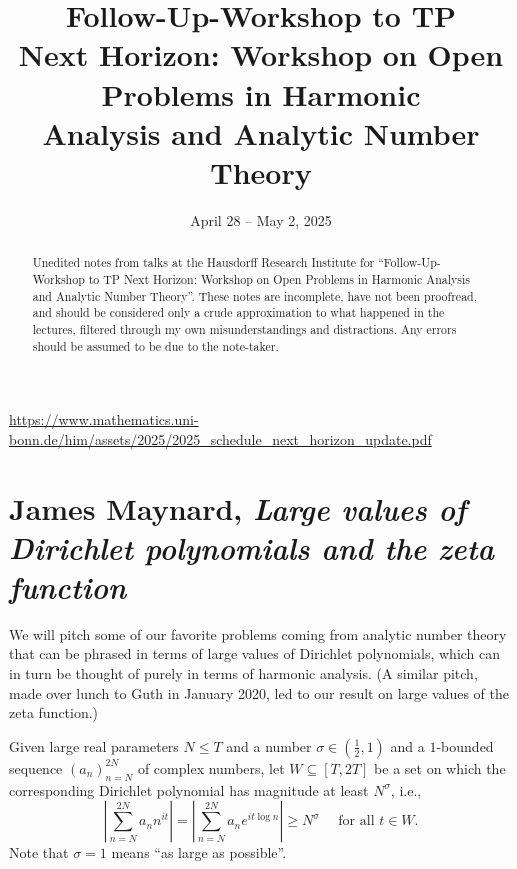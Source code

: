\documentclass[reqno]{amsart} 
\numberwithin{theorem}{section}
\numberwithin{equation}{section}
\begin{document}
\title{Follow-Up-Workshop to TP \\ Next Horizon: Workshop on Open Problems in Harmonic \\ Analysis and Analytic Number Theory}

\begin{abstract}
  Unedited notes from talks at the Hausdorff Research Institute for ``Follow-Up-Workshop to TP Next Horizon: Workshop on Open Problems in Harmonic Analysis and Analytic Number Theory''.  These notes are incomplete, have not been proofread, and should be considered only a crude approximation to what happened in the lectures, filtered through my own misunderstandings and distractions.  Any errors should be assumed to be due to the note-taker.
\end{abstract}

\date{April 28 -- May 2, 2025}

\maketitle

\tableofcontents

\url{https://www.mathematics.uni-bonn.de/him/assets/2025/2025_schedule_next_horizon_update.pdf}

\section{James Maynard, \textnormal{\emph{Large values of Dirichlet polynomials and the zeta function}}}

We will pitch some of our favorite problems coming from analytic number theory that can be phrased in terms of large values of Dirichlet polynomials, which can in turn be thought of purely in terms of harmonic analysis.  (A similar pitch, made over lunch to Guth in January 2020, led to our result on large values of the zeta function.)

Given large real parameters $N \leq T$ and a number $\sigma \in(\tfrac{1}{2}, 1)$ and a $1$-bounded sequence $(a_n)_{n=N}^{2 N}$ of complex numbers, let $W \subseteq[T, 2 T]$ be a set on which the corresponding Dirichlet polynomial has magnitude at least $N^\sigma$, i.e.,
\begin{equation*}
  \left\lvert   \sum_{n = N}^{2 N} a_n n^{i t} \right\rvert = \left\lvert  \sum_{n = N}^{2 N} a_n e^{i t \log n} \right\rvert
  \geq N^\sigma
  \quad
  \text{ for all } t \in W.
\end{equation*}
Note that $\sigma = 1$ means ``as large as possible''.
\end{document}
